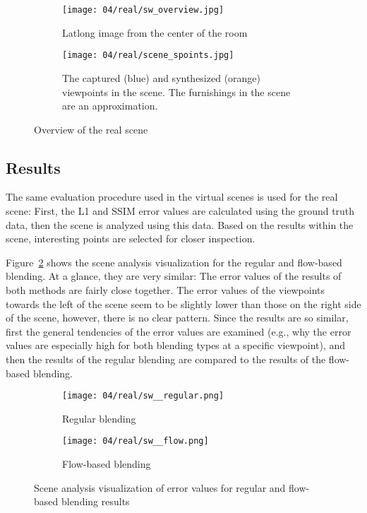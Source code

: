\begin{figure}
\centering
    \hfill
    \begin{subfigure}[c]{0.65\textwidth}
            \centering
            \texttt{[image: 04/real/sw\_overview.jpg]}
            \caption{Latlong image from the center of the room}
    \end{subfigure}
    \hfill
    \begin{subfigure}[c]{0.33\textwidth}
            \centering
            \texttt{[image: 04/real/scene\_spoints.jpg]}
            \caption{The captured (blue) and synthesized (orange) viewpoints in the scene. The furnishings in the scene are an approximation.}
    \end{subfigure}
    \hfill
  \caption{Overview of the real scene}
  \label{fig:real_setup}
\end{figure}


\subsection{Results}
The same evaluation procedure used in the virtual scenes is used for the real scene: First, the L1 and SSIM error values are calculated using the ground truth data, then the scene is analyzed using this data. Based on the results within the scene, interesting points are selected for closer inspection.

Figure~\ref{fig:real_scene_analysis} shows the scene analysis visualization for the regular and flow-based blending. At a glance, they are very similar: The error values of the results of both methods are fairly close together. The error values of the viewpoints towards the left of the scene seem to be slightly lower than those on the right side of the scene, however, there is no clear pattern. Since the results are so similar, first the general tendencies of the error values are examined (e.g., why the error values are especially high for both blending types at a specific viewpoint), and then the results of the regular blending are compared to the results of the flow-based blending.

\begin{figure}
\centering
    \hfill
    \begin{subfigure}[b]{0.45\textwidth}
            \centering
            \texttt{[image: 04/real/sw\_\_regular.png]}
            \caption{Regular blending}
    \end{subfigure}
    \hfill
    \begin{subfigure}[b]{0.45\textwidth}
            \centering
            \texttt{[image: 04/real/sw\_\_flow.png]}
            \caption{Flow-based blending}
    \end{subfigure}
    \hfill
  \caption{Scene analysis visualization of error values for regular and flow-based blending results}
  \label{fig:real_scene_analysis}
\end{figure}


